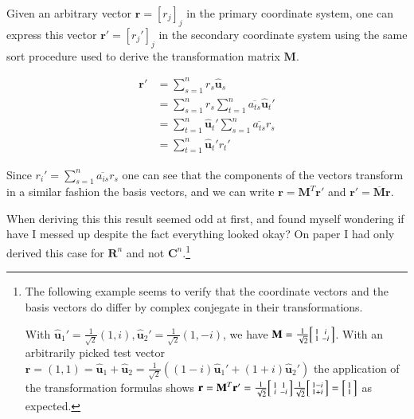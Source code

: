 \documentclass{article}      %
\newcommand{\Br}[0]{\mathbf{r}}
\newcommand{\Bu}[0]{\mathbf{u}}
\newcommand{\BM}[0]{\mathbf{M}}
\newcommand{\Cn}[0]{\mathbf{C}^n}
\newcommand{\Rn}[0]{\mathbf{R}^n}
\newcommand{\ucap}[1]{\hat{\Bu}_{#1}}
\newcommand{\inv}[1]{\frac{1}{#1}}
\begin{document}
Given an arbitrary vector $\Br = [r_j]_j$ in the primary coordinate system, one
can express this vector $\Br' = [r_j']_j$ in the secondary coordinate system using
the same sort procedure used to derive the transformation matrix $\BM$.

\begin{align*}
\Br' &=
      \sum_{s=1}^n
      {
       r_s
       \ucap{s}
      } \\
      &=
      \sum_{s=1}^n
      {
       r_s
\sum_{t=1}^n
{
\overline{a_{ts}}
\ucap{t}'
}
      } \\
      &=
\sum_{t=1}^n
      {
\ucap{t}'
      \sum_{s=1}^n
{
\overline{a_{ts}}
       r_s
}
      } \\
      &=
\sum_{t=1}^n
      {
\ucap{t}'
r_t'
      }
\end{align*}

Since $r_i' =
      \sum_{s=1}^n
{
\overline{a_{is}}
       r_s
}
$
one can see that the components of the vectors transform
in a similar fashion the
basis vectors, and we can write $\Br = \BM^T \Br'$ and $\Br' = \overline{\BM} \Br$.

When deriving this this result seemed odd at first, and found myself wondering if have I messed up despite the fact everything looked okay?  On paper I had only derived this case for $\Rn$ and not $\Cn$.\footnote{
The following example seems to verify that the coordinate vectors and the basis vectors do differ
by complex conjegate in their transformations.

With $\ucap{1}' = \inv{\sqrt{2}}(1,i), \ucap{2}'=\inv{\sqrt{2}}(1,-i)$, we have
$\BM =
\inv{\sqrt{2}}
\Bigl[
\begin{smallmatrix}
1 & i \\
1 & -i
\end{smallmatrix}
\Bigr]
$.  With an arbitrarily picked test vector
$\Br = (1,1) = \ucap{1} + \ucap{2} = \inv{\sqrt{2}}((1-i)\ucap{1}' + (1+i)\ucap{2}')$ the application of the
transformation formulas shows $\Br = \BM^T \Br' =
\inv{\sqrt{2}}
\Bigl[
\begin{smallmatrix}
1 & 1 \\
i & -i
\end{smallmatrix}
\Bigr]
\inv{\sqrt{2}}
\Bigl[
\begin{smallmatrix}
1 - i \\
1 + i
\end{smallmatrix}
\Bigr]
=
\Bigl[
\begin{smallmatrix}
1 \\
1
\end{smallmatrix}
\Bigr]
$ as expected.
}
\end{document}
